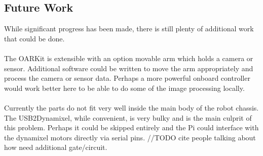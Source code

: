 \documentclass[]{article}
\begin{document}
\subsection{Future Work}
While significant progress has been made, there is still plenty of additional work that could be done.
\\
\\
The OARKit is extensible with an option movable arm which holds a camera or sensor. Additional software could be written to move the arm appropriately and process the camera or sensor data. Perhaps a more powerful onboard controller would work better here to be able to do some of the image processing locally.
\\
\\
Currently the parts do not fit very well inside the main body of the robot chassis. The USB2Dynamixel, while convenient, is very bulky and is the main culprit of this problem. Perhaps it could be skipped entirely and the Pi could interface with the dynamixel motors directly via serial pins. //TODO cite people talking about how need additional gate/circuit.
\end{document}
